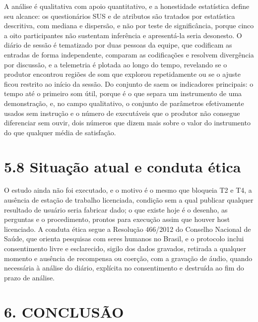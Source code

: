 \documentclass[11pt,a4paper]{article}
\begin{document}
A análise é qualitativa com apoio quantitativo, e a honestidade estatística define seu alcance: os questionários SUS e de atributos são tratados por estatística descritiva, com mediana e dispersão, e não por teste de significância, porque cinco a oito participantes não sustentam inferência e apresentá-la seria desonesto. O diário de sessão é tematizado por duas pessoas da equipe, que codificam as entradas de forma independente, comparam as codificações e resolvem divergência por discussão, e a telemetria é plotada ao longo do tempo, revelando se o produtor encontrou regiões de som que explorou repetidamente ou se o ajuste ficou restrito ao início da sessão. Do conjunto de saem os indicadores principais: o tempo até o primeiro som útil, porque é o que separa um instrumento de uma demonstração, e, no campo qualitativo, o conjunto de parâmetros efetivamente usados sem instrução e o número de executáveis que o produtor não consegue diferenciar sem ouvir, dois números que dizem mais sobre o valor do instrumento do que qualquer média de satisfação.


\section*{5.8 Situação atual e conduta ética}

O estudo ainda não foi executado, e o motivo é o mesmo que bloqueia T2 e T4, a ausência de estação de trabalho licenciada, condição sem a qual publicar qualquer resultado de usuário seria fabricar dado; o que existe hoje é o desenho, as perguntas e o procedimento, prontos para execução assim que houver host licenciado. A conduta ética segue a Resolução 466/2012 do Conselho Nacional de Saúde, que orienta pesquisas com seres humanos no Brasil, e o protocolo inclui consentimento livre e esclarecido, sigilo dos dados gravados, retirada a qualquer momento e ausência de recompensa ou coerção, com a gravação de áudio, quando necessária à análise do diário, explícita no consentimento e destruída ao fim do prazo de análise.


\section*{6. CONCLUSÃO}
\end{document}
